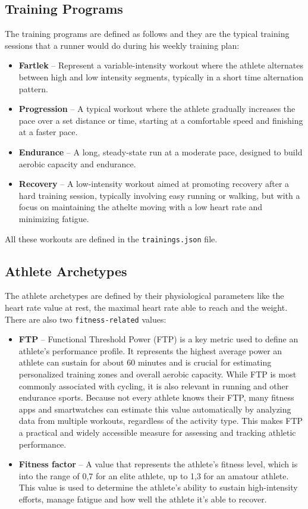 \subsection{Training Programs}
The training programs are defined as follows and they are the typical training sessions that a runner would do during his weekly training plan:
\begin{itemize}
  \item \textbf{Fartlek} – Represent a variable-intensity workout where the athlete alternates between high and low intensity segments, typically in a short time alternation pattern.
  \item \textbf{Progression} – A typical workout where the athlete gradually increases the pace over a set distance or time, starting at a comfortable speed and finishing at a faster pace.
  \item \textbf{Endurance} – A long, steady-state run at a moderate pace, designed to build aerobic capacity and endurance.
  \item \textbf{Recovery} – A low-intensity workout aimed at promoting recovery after a hard training session, typically involving easy running or walking, but with a focus on maintaining the athelte moving with a low heart rate and minimizing fatigue.
\end{itemize}
All these workouts are defined in the \texttt{trainings.json} file.

\subsection{Athlete Archetypes}
The athlete archetypes are defined by their physiological parameters like the heart rate value at rest, the maximal heart rate able to reach and the weight. There are also two \texttt{fitness-related} values: 
\begin{itemize}
\item \textbf{FTP} – Functional Threshold Power (FTP) is a key metric used to define an athlete's performance profile. It represents the highest average power an athlete can sustain for about 60 minutes and is crucial for estimating personalized training zones and overall aerobic capacity. While FTP is most commonly associated with cycling, it is also relevant in running and other endurance sports. Because not every athlete knows their FTP, many fitness apps and smartwatches can estimate this value automatically by analyzing data from multiple workouts, regardless of the activity type. This makes FTP a practical and widely accessible measure for assessing and tracking athletic performance.
\item \textbf{Fitness factor} – A value that represents the athlete's fitness level, which is into the range of 0,7 for an elite athlete, up to 1,3 for an amatour athlete. This value is used to determine the athlete's ability to sustain high-intensity efforts, manage fatigue and how well the athlete it's able to recover.
\end{itemize}

